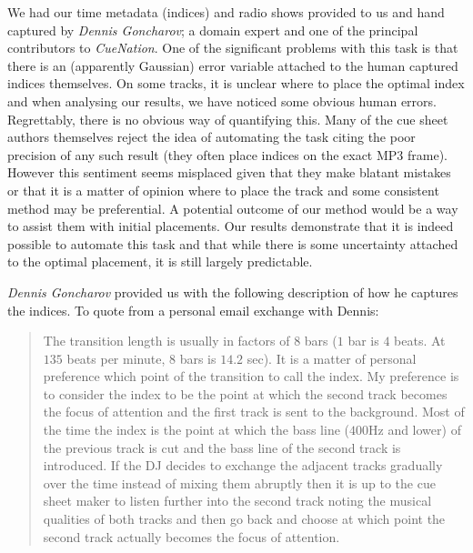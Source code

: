 \documentclass[twocolumn]{article}
\begin{document}
We had our time metadata (indices) and radio shows provided to us and hand captured by \textit{Dennis Goncharov}; a domain expert and one of the principal contributors to \textit{CueNation}. One of the significant problems with this task is that there is an (apparently Gaussian) error variable attached to the human captured indices themselves. On some tracks, it is unclear where to place the optimal index and when analysing our results, we have noticed some obvious human errors. Regrettably, there is no obvious way of quantifying this. Many of the cue sheet authors themselves reject the idea of automating the task citing the poor precision of any such result (they often place indices on the exact MP3 frame). However this sentiment seems misplaced given that they make blatant mistakes or that it is a matter of opinion where to place the track and some consistent method may be preferential. A potential outcome of our method would be a way to assist them with initial placements. Our results demonstrate that it is indeed possible to automate this task and that while there is some uncertainty attached to the optimal placement, it is still largely predictable.

\textit{Dennis Goncharov} provided us with the following description of how he captures the indices. To quote from a personal email exchange with Dennis:

\begin{quote}
	The transition length is usually in factors of $8$ bars ($1$ bar is $4$ beats. At $135$ beats per minute, $8$ bars is $14.2$ sec). It is a matter of personal preference which point of the transition to call the index. My preference is to consider the index to be the point at which the second track becomes the focus of attention and the first track is sent to the background. Most of the time the index is the point at which the bass line ($400$Hz and lower) of the previous track is cut and the bass line of the second track is introduced. If the DJ decides to exchange the adjacent tracks gradually over the time instead of mixing them abruptly then it is up to the cue sheet maker to listen further into the second track noting the musical qualities of both tracks and then go back and choose at which point the second track actually becomes the focus of attention.
\end{quote}
\end{document}
